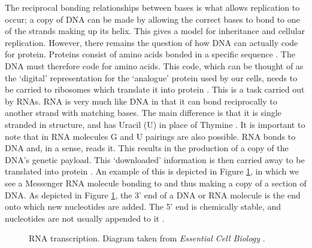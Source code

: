\documentclass{cshonours}
\begin{document}
The reciprocal bonding relationships between bases is what allows replication to occur; a copy of DNA can be made by allowing the correct bases to bond to one of the strands making up its helix. This gives a model for inheritance and cellular replication. However, there remains the question of how DNA can actually code for protein. Proteins consist of amino acids bonded in a specific sequence \cite{albertsessential}. The DNA must therefore code for amino acids. This code, which can be thought of as the `digital' representation for the `analogue' protein used by our cells, needs to be carried to ribosomes which translate it into protein \cite{albertsessential}. This is a task carried out by RNAs. RNA is very much like DNA in that it can bond reciprocally to another strand with matching bases. The main difference is that it is single stranded in structure, and has Uracil (U) in place of Thymine \cite{albertsessential}. It is important to note that in RNA molecules G and U pairings are also possible. RNA bonds to DNA and, in a sense, reads it. This results in the production of a copy of the DNA's genetic payload. This `downloaded' information is then carried away to be translated into protein \cite{albertsessential}. An example of this is depicted in Figure \ref{transcription}, in which we see a Messenger RNA molecule bonding to and thus making a copy of a section of DNA. As depicted in Figure \ref{transcription}, the 3' end of a DNA or RNA molecule is the end onto which new nucleotides are added. The 5' end is chemically stable, and nucleotides are not usually appended to it \cite{albertsessential}.

\begin{figure}
\begin{center}
\end{center}
\caption{RNA transcription. Diagram taken from \emph{Essential Cell Biology} \cite{albertsessential}.}
\label{transcription}
\end{figure}
\end{document}
